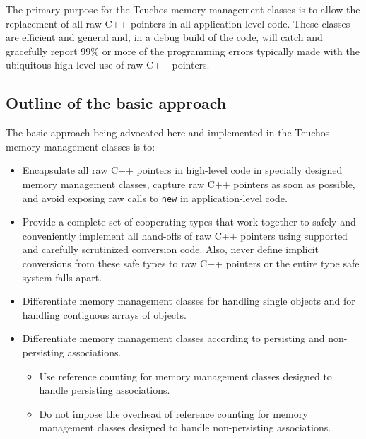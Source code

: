 \documentclass[pdf,ps2pdf,11pt]{SANDreport}
\begin{document}
The primary purpose for the Teuchos memory management classes is to
allow the replacement of all raw C++ pointers in all application-level
code.  These classes are efficient and general and, in a debug build
of the code, will catch and gracefully report 99\% or more of the
programming errors typically made with the ubiquitous high-level use
of raw C++ pointers.


%
{}\subsection{Outline of the basic approach}
{}\label{sec:outline_of_basic_approach}
%

The basic approach being advocated here and implemented in the Teuchos
memory management classes is to:

\begin{itemize}

{}\item Encapsulate all raw C++ pointers in high-level code in
specially designed memory management classes, capture raw C++ pointers
as soon as possible, and avoid exposing raw calls to {}\texttt{new} in
application-level code.

{}\item Provide a complete set of cooperating types that work together
to safely and conveniently implement all hand-offs of raw C++
pointers using supported and carefully scrutinized conversion code.
Also, never define implicit conversions from these safe types to raw
C++ pointers or the entire type safe system falls apart.

{}\item Differentiate memory management classes for handling single
objects and for handling contiguous arrays of objects.

{}\item Differentiate memory management classes according to
persisting and non-persisting associations.

  \begin{itemize}

  {}\item Use reference counting for memory management classes
  designed to handle persisting associations.

  {}\item Do not impose the overhead of reference counting for memory
  management classes designed to handle non-persisting associations.

  \end{itemize}


\end{itemize}
\end{document}
